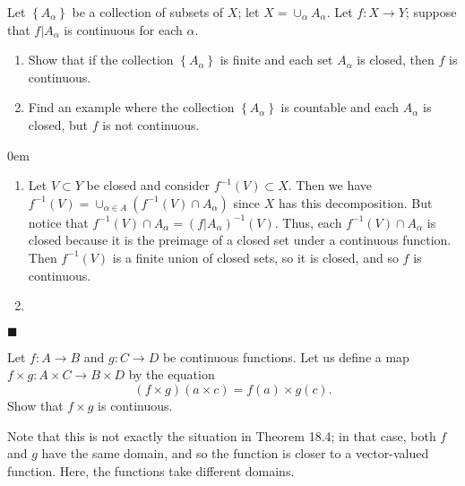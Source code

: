 \documentclass[12pt]{article}
\renewcommand{\qed}{\hfill$\blacksquare$}
\renewenvironment{proof}{\begin{addmargin}[1em]{0em}\begin{newproof}}{\end{newproof}\end{addmargin}\qed}
\newenvironment{problem}[2][Exercise]{\begin{trivlist}
\item[\hskip \labelsep {\bfseries #1}\hskip \labelsep {\bfseries #2.}]}{\end{trivlist}}
\begin{document}
\begin{problem}{18.9}
	Let $\left\{A_{\alpha}\right\}$ be a collection of subsets of $X$; let $X=\cup_{\alpha}A_{\alpha}$. Let $f:X\rightarrow Y$; suppose that $f|A_{\alpha}$ is continuous for each $\alpha$.
	\begin{enumerate}[label=(\alph*)]
		\item Show that if the collection $\left\{A_{\alpha}\right\}$ is finite and each set $A_{\alpha}$ is closed, then $f$ is continuous.
		\item Find an example where the collection $\left\{A_{\alpha}\right\}$ is countable and each $A_{\alpha}$ is closed, but $f$ is not continuous.
	\end{enumerate}
\end{problem}
\begin{proof}
	\begin{enumerate}[label=(\alph*)]
		\item Let $V\subset Y$ be closed and consider $f^{-1}\left(V\right) \subset X$. Then we have $f^{-1}\left(V\right) = \cup_{\alpha \in A} \left(  f^{-1}\left(V\right) \cap A_{\alpha} \right)$ since $X$ has this decomposition. But notice that $f^{-1}\left(V\right)\cap A_{\alpha} = \left( f|A_{\alpha}\right)^{-1}\left(V\right)$. Thus, each $f^{-1}\left(V\right) \cap A_{\alpha} $ is closed because it is the preimage of a closed set under a continuous function. Then $f^{-1}\left(V\right)$ is a finite union of closed sets, so it is closed, and so $f$ is continuous.
		\item 
	\end{enumerate}	
\end{proof}

\begin{problem}{18.10}
	Let $f:A\rightarrow B$ and $g:C\rightarrow D$ be continuous functions. Let us define a map $f\times g: A\times C \rightarrow B\times D$ by the equation $$ \left(f\times g\right)\left(a\times c\right) = f\left(a\right)\times g\left(c\right).$$ Show that $f\times g$ is continuous.
\end{problem}
{\color{red}Note that this is not exactly the situation in Theorem 18.4; in that case, both $f$ and $g$ have the same domain, and so the function is closer to a vector-valued function. Here, the functions take different domains.}\\
\end{document}
